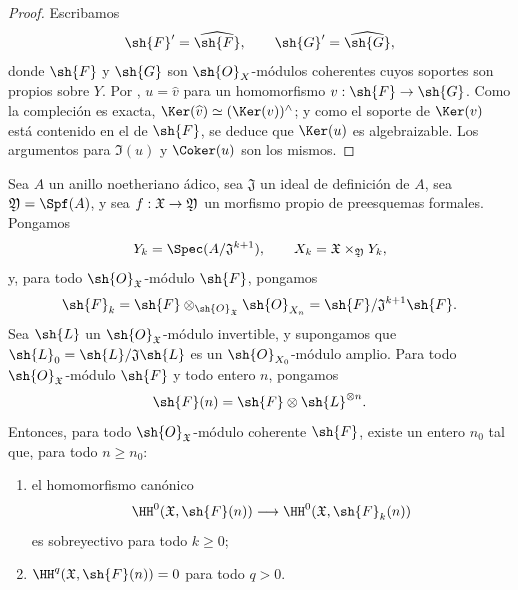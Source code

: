 \documentclass[oneside]{amsart}
\makeatletter
\renewcommand{\geq}{\geqslant}
\newcommand{\ega@arrow}[2]{\mathchoice{#1}{#2}{#2}{#2}}
\renewcommand{\to}{\ega@arrow{\longrightarrow}{\rightarrow}}
\let\EGAOriginalLabel\label
\renewcommand{\label}[1]{\phantomsection\EGAOriginalLabel{#1}}
\makeatother
\begin{document}
\begin{proof}
Escribamos
\[
  \sh{F}'=\widehat{\sh{F}},\qquad
  \sh{G}'=\widehat{\sh{G}},
\]
donde $\sh{F}$ y $\sh{G}$ son $\sh{O}_X$-módulos coherentes cuyos
soportes son propios sobre $Y$. Por ,
$u=\widehat{v}$ para un homomorfismo
$v:\sh{F}\to\sh{G}$. Como la compleción es exacta,
$\Ker(\widehat{v})\simeq(\Ker(v))^{\wedge}$; y como el soporte
de $\Ker(v)$ está contenido en el de $\sh{F}$, se deduce que
$\Ker(u)$ es algebraizable. Los argumentos para $\Im(u)$ y
$\Coker(u)$ son los mismos.
\end{proof}

\begin{proposition}[5.2.3]
\label{III.5.2.3}
Sea $A$ un anillo noetheriano ádico, sea $\mathfrak{J}$ un ideal de
definición de $A$, sea $\mathfrak{Y}=\Spf(A)$, y sea
$f:\mathfrak{X}\to\mathfrak{Y}$ un morfismo propio de preesquemas
formales. Pongamos
\[
  Y_k=\Spec(A/\mathfrak{J}^{k+1}),\qquad
  X_k=\mathfrak{X}\times_{\mathfrak{Y}}Y_k,
\]
y, para todo $\sh{O}_{\mathfrak{X}}$-módulo $\sh{F}$, pongamos
\[
  \sh{F}_k
  =
  \sh{F}\otimes_{\sh{O}_{\mathfrak{X}}}\sh{O}_{X_n}
  =
  \sh{F}/\mathfrak{J}^{k+1}\sh{F}.
\]
Sea $\sh{L}$ un $\sh{O}_{\mathfrak{X}}$-módulo invertible, y
supongamos que
$\sh{L}_0=\sh{L}/\mathfrak{J}\sh{L}$ es un
$\sh{O}_{X_0}$-módulo amplio. Para todo
$\sh{O}_{\mathfrak{X}}$-módulo $\sh{F}$ y todo entero $n$, pongamos
\[
  \sh{F}(n)=\sh{F}\otimes\sh{L}^{\otimes n}.
\]
Entonces, para todo $\sh{O}_{\mathfrak{X}}$-módulo coherente $\sh{F}$,
existe un entero $n_0$ tal que, para todo $n\geq n_0$:
\begin{enumerate}
  \item[\rm{(i)}] el homomorfismo canónico
    \[
      \HH^0(\mathfrak{X},\sh{F}(n))
      \longrightarrow
      \HH^0(\mathfrak{X},\sh{F}_k(n))
    \]
    es sobreyectivo para todo $k\geq0$;
  \item[\rm{(ii)}]
    $\HH^q(\mathfrak{X},\sh{F}(n))=0$ para todo $q>0$.
\end{enumerate}
\end{proposition}
\end{document}
